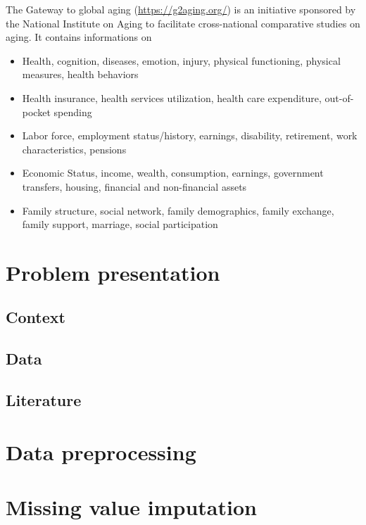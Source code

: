 \documentclass[a4paper, 11pt]{article}
\begin{document}
The Gateway to global aging (\url{https://g2aging.org/}) is an
initiative sponsored by the National Institute on Aging to facilitate
cross-national comparative studies on aging. It contains informations
on

\begin{itemize}
\item Health, cognition, diseases, emotion, injury, physical
functioning, physical measures, health behaviors
\item Health insurance, health services utilization, health care
expenditure, out-of-pocket spending
\item Labor force, employment status/history, earnings,
disability, retirement, work characteristics, pensions
\item Economic Status, income, wealth, consumption,
earnings, government transfers, housing, financial and
non-financial assets
\item Family structure, social network, family demographics,
family exchange, family support, marriage, social
participation
\end{itemize}

\section{Problem presentation}

\subsection{Context}

\subsection{Data}

\subsection{Literature}


\section{Data preprocessing}


\section{Missing value imputation}
\end{document}
